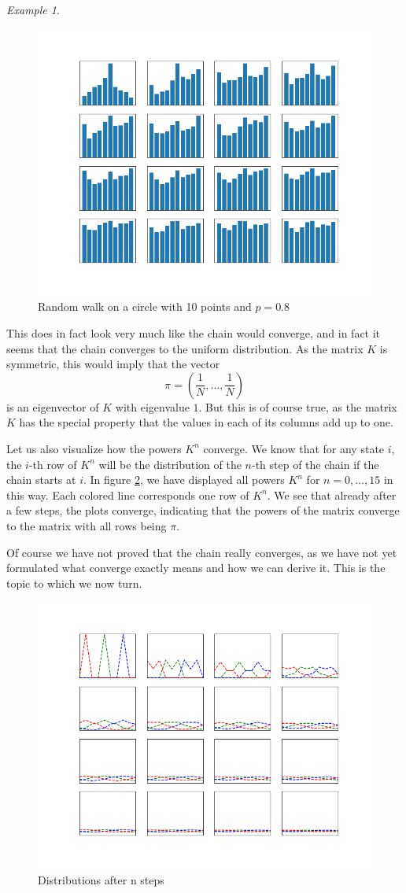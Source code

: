 \documentclass[a4paper, draft]{article}
\theoremstyle{own}
\theoremstyle{remark}
\newtheorem{example}{Example}[section]
\begin{document}
\begin{example}
\begin{figure}[ht]
\centering
\includegraphics[width=0.7\linewidth]{CircleRandomWalk}
\caption{Random walk on a circle with 10 points and $p = 0.8$}
\label{fig:CircleRandomWalk}
\end{figure}


This does in fact look very much like the chain would converge, and in fact it seems that the chain converges to the uniform distribution. As the matrix $K$ is symmetric, this would imply that the vector
$$
\pi = (\frac{1}{N}, \dots, \frac{1}{N})
$$
is an eigenvector of $K$ with eigenvalue $1$. But this is of course true, as the matrix $K$ has the special property that the values in each of its columns add up to one. 

Let us also visualize how the powers $K^n$ converge. We know that for any state $i$, the $i$-th row of $K^n$ will be the distribution of the $n$-th step of the chain if the chain starts at $i$. In figure \ref{fig:CircleRandomWalkMatrixPowers}, we have displayed all powers $K^n$ for $n = 0, \dots, 15$ in this way. Each colored line corresponds one row of $K^n$. We see that already after a few steps, the plots converge, indicating that the powers of the matrix converge to the matrix with all rows being $\pi$.

Of course we have not proved that the chain really converges, as we have not yet formulated what converge exactly means and how we can derive it. This is the topic to which we now turn.

\begin{figure}[ht]
\centering
\includegraphics[width=0.7\linewidth]{CircleRandomWalkMatrixPowers}
\caption{Distributions after n steps}
\label{fig:CircleRandomWalkMatrixPowers}
\end{figure}


\end{example}
\end{document}
